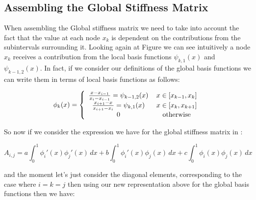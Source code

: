 \subsection{Assembling the Global Stiffness Matrix}\label{sec:oned-deterministic-global-stiffness-assembly}

When assembling the Global stiffness matrix we need to take into account the
fact that the value at each node $x_k$ is dependent on the contributions from
the subintervals surrounding it. Looking again at Figure
 we can see intuitively a node $x_k$ receives a
contribution from the local basis functions $\psi_{k,1}(x)$ and
$\psi_{{k-1},2}(x)$. In fact, if we consider our definitions of the global
basis functions  we can write them in terms of local
basis functions as follows:

\begin{equation}\label{eq:oned-deterministic-local-global-basis}
    \phi_k(x) = \left\{\begin{array}{c c}
                    \frac{x - x_{i-1}}{x_i - x_{i-1}} = \psi_{{k-1},2}(x)\, & x \in [x_{k-1}, x_k] \\
                    \frac{x_{i+1} - x}{x_{i+1} - x_i} = \psi_{k, 1}(x)\, & x \in [x_k, x_{k+1}] \\
                    0\, & \text{otherwise}
             \end{array}\right.
\end{equation}

So now if we consider the expression we have for the global stiffness matrix in
:

\[
   A_{i,j} = a\int_0^1\phi_i'(x)\phi_j'(x)\, dx
             + b\int_0^1\phi_i'(x)\phi_j(x)\, dx
             + c\int_0^1\phi_i(x)\phi_j(x)\, dx
\]

and the moment let's just consider the diagonal elements, corresponding to the
case where $i = k = j$ then using our new representation above for the global
basis functions then we have:

